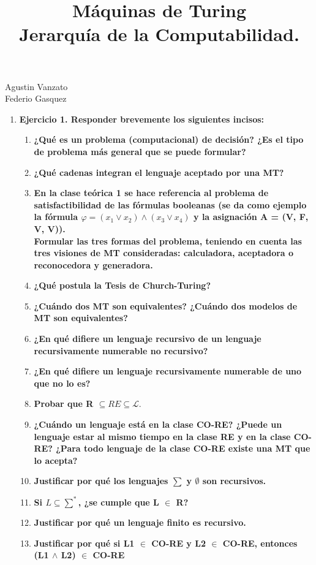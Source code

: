 \documentclass{article}
\title{Máquinas de Turing \\ Jerarquía de la Computabilidad.}
\begin{document}
\newenvironment{solution}{\begin{proof}[Solution]}{\end{proof}}
\maketitle

\large 

\begin{center}

{\Large Agustin Vanzato \\
Federio Gasquez} %
\end{center}
\vspace{0.05in}

\begin{enumerate}

\item \textbf{Ejercicio 1. Responder brevemente los siguientes incisos:}

\begin{enumerate}
\item \textbf{¿Qué es un problema (computacional) de decisión? ¿Es el tipo de problema más general que se puede formular?}
\item \textbf{¿Qué cadenas integran el lenguaje aceptado por una MT?}
\item \textbf{En la clase teórica 1 se hace referencia al problema de satisfactibilidad de las fórmulas booleanas (se da como ejemplo la fórmula $\varphi = (x_1 \vee x_2) \wedge (x_3 \vee x_4)$ y la asignación A = (V, F, V, V)).\\ Formular las tres formas del problema, teniendo en cuenta las tres visiones de MT consideradas: calculadora, aceptadora o reconocedora y generadora.}

\item \textbf{¿Qué postula la Tesis de Church-Turing?}
\item \textbf{¿Cuándo dos MT son equivalentes? ¿Cuándo dos modelos de MT son equivalentes?}
\item \textbf{¿En qué difiere un lenguaje recursivo de un lenguaje recursivamente numerable no recursivo?}
\item \textbf{¿En qué difiere un lenguaje recursivamente numerable de uno que no lo es?}
\item \textbf{Probar que R $\subseteq RE \subseteq \mathcal{L}.$}
\item \textbf{¿Cuándo un lenguaje está en la clase CO-RE? ¿Puede un lenguaje estar al mismo tiempo en la clase RE y en la clase CO-RE? ¿Para todo lenguaje de la clase CO-RE existe una MT que lo acepta?}
\item \textbf{Justificar por qué los lenguajes $\sum$ y $\emptyset$ son recursivos.}
\item \textbf{Si $L \subseteq \sum^*$, ¿se cumple que L $\in$ R?}
\item \textbf{Justificar por qué un lenguaje finito es recursivo.}
\item \textbf{Justificar por qué si L1 $\in$ CO-RE y L2 $\in$ CO-RE, entonces (L1 $\wedge$ L2) $\in$ CO-RE}
\end{enumerate}




\end{enumerate}
\end{document}
